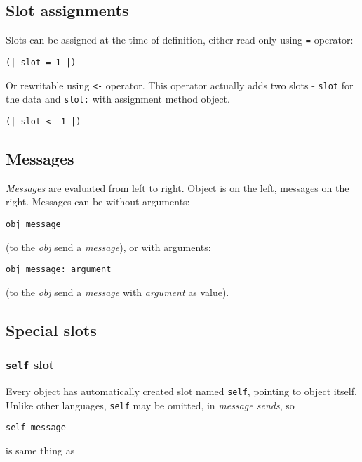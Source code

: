 \documentclass[10pt]{article}
\begin{document}
\begin{multicols*}{3}
\subsection{Slot assignments}

Slots can be assigned at the time of definition, either read only using \texttt{=} operator:

\texttt{(| slot = 1 |)}

Or rewritable using \texttt{<-} operator. This operator actually adds two slots - \texttt{slot} for the data and \texttt{slot:} with assignment method object.

\texttt{(| slot <- 1 |)}



\subsection{Messages}

\textit{Messages} are evaluated from left to right. Object is on the left, messages on the right. Messages can be without arguments:

\begin{lstlisting}
obj message
\end{lstlisting}

(to the \textit{obj} send a \textit{message}), or with arguments:

\begin{lstlisting}
obj message: argument
\end{lstlisting}

(to the \textit{obj} send a \textit{message} with \textit{argument} as value).




\columnbreak
\subsection{Special slots}

\subsubsection{\texttt{self} slot}
Every object has automatically created slot named \texttt{self}, pointing to object itself. Unlike other languages, \texttt{self} may be omitted, in \textit{message sends}, so

\begin{lstlisting}
self message
\end{lstlisting}

is same thing as


\end{multicols*}
\end{document}
